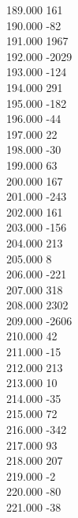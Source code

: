 { 189.000	161 \\
 190.000	-82 \\
 191.000	1967 \\
 192.000	-2029 \\
 193.000	-124 \\
 194.000	291 \\
 195.000	-182 \\
 196.000	-44 \\
 197.000	22 \\
 198.000	-30 \\
 199.000	63 \\
 200.000	167 \\
 201.000	-243 \\
 202.000	161 \\
 203.000	-156 \\
 204.000	213 \\
 205.000	8 \\
 206.000	-221 \\
 207.000	318 \\
 208.000	2302 \\
 209.000	-2606 \\
 210.000	42 \\
 211.000	-15 \\
 212.000	213 \\
 213.000	10 \\
 214.000	-35 \\
 215.000	72 \\
 216.000	-342 \\
 217.000	93 \\
 218.000	207 \\
 219.000	-2 \\
 220.000	-80 \\
 221.000	-38 \\
}
